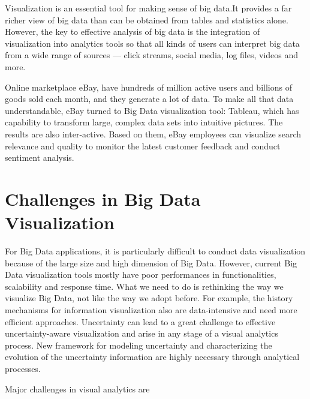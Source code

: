 Visualization is an essential tool for making sense of big data.It provides a far richer view of big data than can be obtained  from tables and statistics alone. However, the key to effective analysis of big data is the integration of visualization into analytics tools so that all kinds of users can interpret big data from a wide range of sources — click streams, social media, log files, videos and more.
\par
Online marketplace eBay, have hundreds of million active users and billions of goods sold each month, and they generate a lot of data. To make all that data understandable, eBay turned to Big Data visualization tool: Tableau, which has capability to transform large, complex data sets into intuitive pictures. The results are also inter-active. Based on them, eBay employees can visualize search relevance and quality to monitor the latest customer feedback and conduct sentiment analysis.
\section{Challenges in Big Data Visualization}
For Big Data applications, it is particularly difficult to conduct data visualization because of the large size and high dimension of Big Data. However, current Big Data visualization tools mostly have poor performances in functionalities, scalability and response time. What we need to do is rethinking the way we visualize Big Data, not like the way we adopt before. For example, the history mechanisms for information visualization also are data-intensive and need more efficient approaches. Uncertainty can lead to a great challenge to effective uncertainty-aware visualization and arise in any stage of a visual analytics process. New framework for modeling uncertainty and characterizing the evolution of the uncertainty information are highly necessary through analytical processes.
\par Major challenges in visual analytics are
